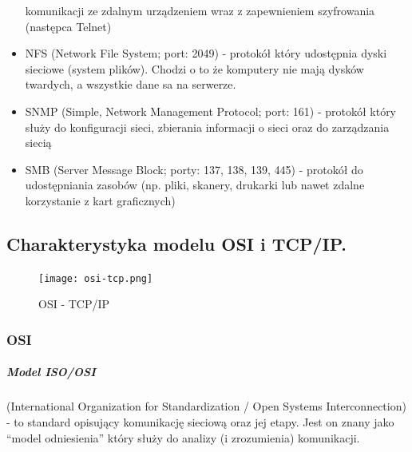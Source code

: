 \documentclass[a4paper,12pt,oneside]{book}
\begin{document}
\begin{itemize}
					komunikacji ze zdalnym urządzeniem wraz z zapewnieniem szyfrowania (następca
					Telnet)
					\item NFS (Network File System; port: 2049) - protokół który udostępnia dyski sieciowe
					(system plików). Chodzi o to że komputery nie mają dysków twardych, a wszystkie
					dane sa na serwerze.
					\item SNMP (Simple, Network Management Protocol; port: 161) - protokół który służy do
					konfiguracji sieci, zbierania informacji o sieci oraz do zarządzania siecią
					\item SMB (Server Message Block; porty: 137, 138, 139, 445) - protokół do udostępniania
					zasobów (np. pliki, skanery, drukarki lub nawet zdalne korzystanie z kart graficznych)
				\end{itemize}
			\newpage\subsection{Charakterystyka modelu OSI i TCP/IP.}
			\label{model}
				\begin{figure}[h!]
					\centering\texttt{[image: osi-tcp.png]}
					\caption{OSI - TCP/IP}
				\end{figure}
				\subsubsection{OSI}
				\subparagraph{Model ISO/OSI} (International Organization for Standardization / Open Systems
				Interconnection) - to standard opisujący komunikację sieciową oraz jej etapy. Jest on znany
				jako “model odniesienia” który służy do analizy (i zrozumienia) komunikacji.
				
\end{document}
